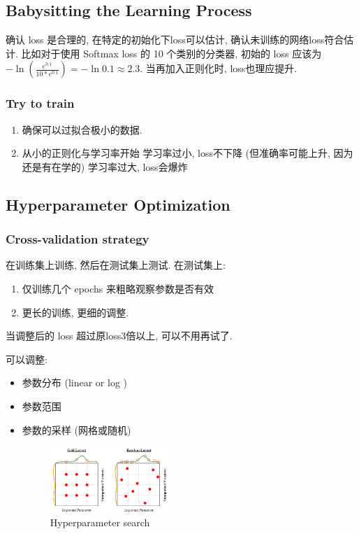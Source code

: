 \subsection{Babysitting the Learning Process}
确认 loss 是合理的, 在特定的初始化下loss可以估计, 确认未训练的网络loss符合估计. 比如对于使用 Softmax loss 的 10 个类别的分类器, 初始的 loss 应该为 $-\ln \left( \frac{e^{0.1}}{10*e^{0.1}} \right)= -\ln 0.1 \approx 2.3$. 当再加入正则化时, loss也理应提升. 

\subsubsection{Try to train}
\begin{enumerate}
    \item 确保可以过拟合极小的数据. 
    \item 从小的正则化与学习率开始
    \subitem 学习率过小, loss不下降 (但准确率可能上升, 因为还是有在学的)
    \subitem 学习率过大, loss会爆炸
\end{enumerate}

\subsection{Hyperparameter Optimization}
\subsubsection{Cross-validation strategy}
在训练集上训练, 然后在测试集上测试. 在测试集上:
\begin{enumerate}
    \item 仅训练几个 epochs 来粗略观察参数是否有效
    \item 更长的训练, 更细的调整. 
\end{enumerate}
当调整后的 loss 超过原loss3倍以上, 可以不用再试了. 

可以调整:
\begin{itemize}
    \item 参数分布 (linear or log )
    \item 参数范围
    \item 参数的采样 (网格或随机)
    \begin{figure}[!htb]
        \centering
        \includegraphics[width=0.42\textwidth]{pic/Lec6/Hyperparameter search}
        \caption{Hyperparameter search}
    \end{figure}
\end{itemize}


